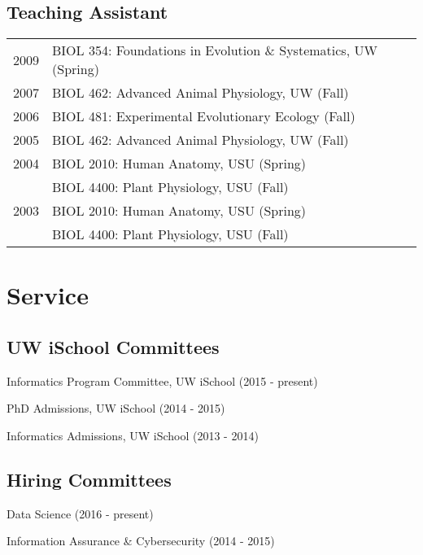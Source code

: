 \documentclass[11pt]{article}
\renewenvironment{itemize}{
  \begin{list}{}{
    \setlength{\leftmargin}{1.5em}
  }
}{
  \end{list}
}
\begin{document}
\subsection*{Teaching Assistant}
\begin{longtable}{p{0.5in}|p{5.5in}}
  2009  & BIOL 354:  Foundations in Evolution \& Systematics, UW (Spring) \\
  2007  & BIOL 462:  Advanced Animal Physiology, UW (Fall) \\
  2006  & BIOL 481:  Experimental Evolutionary Ecology (Fall) \\
  2005  & BIOL 462:  Advanced Animal Physiology, UW (Fall) \\
  2004  & BIOL 2010:  Human Anatomy, USU (Spring) \\
        & BIOL 4400:  Plant Physiology, USU (Fall) \\
  2003  & BIOL 2010:  Human Anatomy, USU (Spring) \\
        & BIOL 4400:  Plant Physiology, USU (Fall) \\     
\end{longtable}






\section*{\textbf{Service}}

\subsection*{UW iSchool Committees}
\begin{itemize}
\item Informatics Program Committee, UW iSchool (2015 - present)
\item PhD Admissions, UW iSchool (2014 - 2015)
\item Informatics Admissions, UW iSchool (2013 - 2014) 
\end{itemize}

\subsection*{Hiring Committees}
\begin{itemize}
\item Data Science (2016 - present)
\item Information Assurance \& Cybersecurity (2014 - 2015)
\end{itemize}
\end{document}
